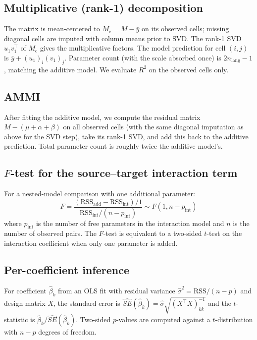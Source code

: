 \documentclass[11pt]{article}
\begin{document}
\subsection{Multiplicative (rank-1) decomposition}

The matrix is mean-centered to $M_{\text{c}} = M - \bar y$ on its
observed cells; missing diagonal cells are imputed with column means
prior to SVD. The rank-1 SVD $u_1 v_1^\top$ of $M_{\text{c}}$ gives the
multiplicative factors. The model prediction for cell $(i, j)$ is
$\bar y + (u_1)_i (v_1)_j$. Parameter count (with the scale absorbed
once) is $2 n_{\text{lang}} - 1$, matching the additive model. We
evaluate $R^2$ on the observed cells only.

\subsection{AMMI}

After fitting the additive model, we compute the residual matrix
$M - (\mu + \alpha + \beta)$ on all observed cells (with the same
diagonal imputation as above for the SVD step), take its rank-1 SVD,
and add this back to the additive prediction. Total parameter count is
roughly twice the additive model's.

\subsection{$F$-test for the source--target interaction term}

For a nested-model comparison with one additional parameter:
\[
F = \frac{(\mathrm{RSS}_{\text{add}} - \mathrm{RSS}_{\text{int}}) / 1}
        {\mathrm{RSS}_{\text{int}} / (n - p_{\text{int}})}
   \sim F(1, n - p_{\text{int}})
\]
where $p_{\text{int}}$ is the number of free parameters in the
interaction model and $n$ is the number of observed pairs. The
$F$-test is equivalent to a two-sided $t$-test on the interaction
coefficient when only one parameter is added.

\subsection{Per-coefficient inference}

For coefficient $\hat\beta_k$ from an OLS fit with residual variance
$\hat\sigma^2 = \mathrm{RSS} / (n - p)$ and design matrix $X$, the
standard error is $\widehat{SE}(\hat\beta_k) = \hat\sigma \sqrt{(X^\top
X)^{-1}_{kk}}$ and the $t$-statistic is $\hat\beta_k /
\widehat{SE}(\hat\beta_k)$. Two-sided $p$-values are computed against
a $t$-distribution with $n - p$ degrees of freedom.
\end{document}
